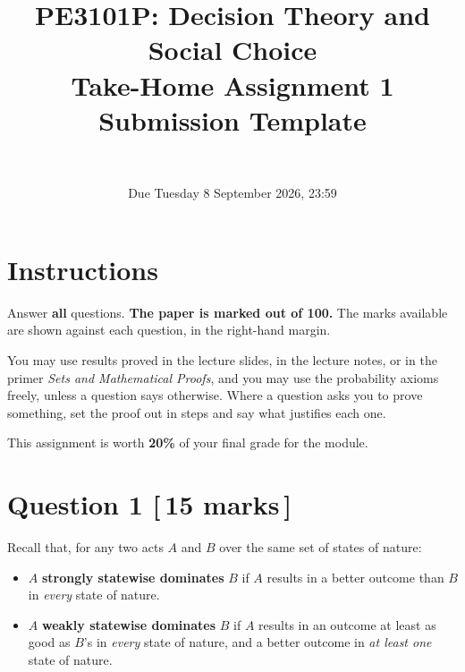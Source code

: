 \documentclass[11pt]{article}
\title{PE3101P: Decision Theory and Social Choice\\[0.3em]
       \large Take-Home Assignment 1\\[0.2em]
       \large Submission Template}
\author{\studentname \\ \studentnumber}
\date{Due Tuesday 8 September 2026, 23:59}
\theoremstyle{definition}
\begin{document}
\maketitle

\section*{Instructions}

Answer \textbf{all} questions. \textbf{The paper is marked out of 100.} The
marks available are shown against each question, in the right-hand margin.

You may use results proved in the lecture slides, in the lecture notes, or in
the primer \emph{Sets and Mathematical Proofs}, and you may use the probability
axioms freely, unless a question says otherwise. Where a question asks you to
prove something, set the proof out in steps and say what justifies each one.

This assignment is worth \textbf{20\%} of your final grade for the module.

\section*{Question 1 \hfill \normalsize [\,15 marks\,]}

Recall that, for any two acts $A$ and $B$ over the same set of states of nature:

\begin{itemize}
	\item[--] $A$ \textbf{strongly statewise dominates} $B$ if $A$ results in a
	better outcome than $B$ in \emph{every} state of nature.
	\item[--] $A$ \textbf{weakly statewise dominates} $B$ if $A$ results in an
	outcome at least as good as $B$'s in \emph{every} state of nature, and a
	better outcome in \emph{at least one} state of nature.
\end{itemize}
\end{document}
